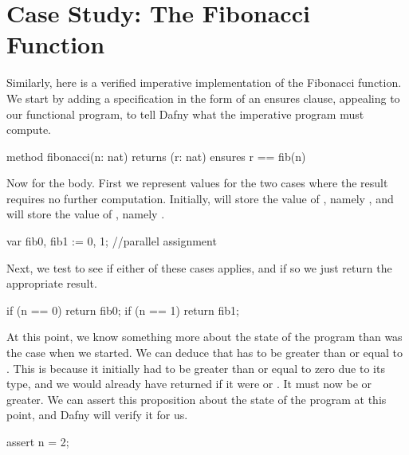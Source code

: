 \documentclass[letterpaper,10pt,english]{sphinxmanual}
\begin{document}
\section{Case Study: The Fibonacci Function}
\label{\detokenize{05-verifying-logical-specifications:case-study-the-fibonacci-function}}
Similarly, here is a verified imperative implementation of the
Fibonacci function. We start by adding a specification in the
form of an ensures clause, appealing to our functional program,
to tell Dafny what the imperative program must compute.

\begin{sphinxVerbatim}[commandchars=\\\{\}]
method fibonacci(n: nat) returns (r: nat)
    ensures r == fib(n)
\end{sphinxVerbatim}

Now for the body. First we represent values for the two cases where
the result requires no further computation.  Initially,  will
store the value of , namely , and  will store the
value of , namely .

\begin{sphinxVerbatim}[commandchars=\\\{\}]
var fib0, fib1 := 0, 1; //parallel assignment
\end{sphinxVerbatim}

Next, we test to see if either of these cases applies,
and if so we just return the appropriate result.

\begin{sphinxVerbatim}[commandchars=\\\{\}]
if (n == 0) \PYGZob{} return fib0; \PYGZcb{}
if (n == 1) \PYGZob{} return fib1; \PYGZcb{}
\end{sphinxVerbatim}

At this point, we know something more about the state of the program
than was the case when we started. We can deduce that  has to be
greater than or equal to . This is because it initially had to be
greater than or equal to zero due to its type, and we would already
have returned if it were  or . It must now be  or greater. We
can assert this proposition about the state of the program at this
point, and Dafny will verify it for us.

\begin{sphinxVerbatim}[commandchars=\\\{\}]
assert n \PYGZgt{}= 2;
\end{sphinxVerbatim}
\end{document}
